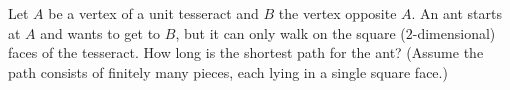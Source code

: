 Let $A$ be a vertex of a unit tesseract and $B$ the vertex opposite $A$. An ant starts at $A$ and wants to get to $B$, but it can only walk on the square ($2$-dimensional) faces of the tesseract. How long is the shortest path for the ant? (Assume the path consists of finitely many pieces, each lying in a single square face.)
